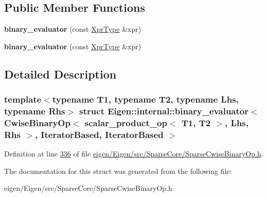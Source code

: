 \subsection*{Public Member Functions}
\begin{DoxyCompactItemize}
\item 
\mbox{\label{struct_eigen_1_1internal_1_1binary__evaluator_3_01_cwise_binary_op_3_01scalar__product__op_3_01_c08fe00fb24daf817c472c5c54760eed_a3d9715fa9b763957643996d9dda10067}} 
{\bfseries binary\+\_\+evaluator} (const \hyperlink{group___core___module_class_eigen_1_1_cwise_binary_op}{Xpr\+Type} \&xpr)
\item 
\mbox{\label{struct_eigen_1_1internal_1_1binary__evaluator_3_01_cwise_binary_op_3_01scalar__product__op_3_01_c08fe00fb24daf817c472c5c54760eed_a3d9715fa9b763957643996d9dda10067}} 
{\bfseries binary\+\_\+evaluator} (const \hyperlink{group___core___module_class_eigen_1_1_cwise_binary_op}{Xpr\+Type} \&xpr)
\end{DoxyCompactItemize}


\subsection{Detailed Description}
\subsubsection*{template$<$typename T1, typename T2, typename Lhs, typename Rhs$>$\newline
struct Eigen\+::internal\+::binary\+\_\+evaluator$<$ Cwise\+Binary\+Op$<$ scalar\+\_\+product\+\_\+op$<$ T1, T2 $>$, Lhs, Rhs $>$, Iterator\+Based, Iterator\+Based $>$}



Definition at line \hyperlink{eigen_2_eigen_2src_2_sparse_core_2_sparse_cwise_binary_op_8h_source_l00336}{336} of file \hyperlink{eigen_2_eigen_2src_2_sparse_core_2_sparse_cwise_binary_op_8h_source}{eigen/\+Eigen/src/\+Sparse\+Core/\+Sparse\+Cwise\+Binary\+Op.\+h}.



The documentation for this struct was generated from the following file\+:\begin{DoxyCompactItemize}
\item 
eigen/\+Eigen/src/\+Sparse\+Core/\+Sparse\+Cwise\+Binary\+Op.\+h\end{DoxyCompactItemize}
